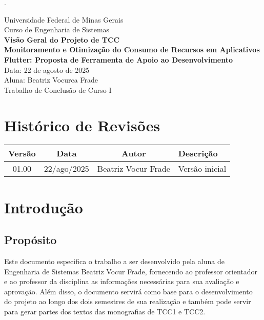 \documentclass[12pt,a4paper]{article}
\begin{document}
.
\begin{center}
\Large
Universidade Federal de Minas Gerais \\
Curso de Engenharia de Sistemas \\[3cm]


\textbf{\LARGE Visão Geral do Projeto de TCC} \\[1cm]


\textbf{Monitoramento e Otimização do Consumo de Recursos em Aplicativos Flutter: Proposta de Ferramenta de Apoio ao Desenvolvimento} \\[4cm]


Data: 22 de agosto de 2025 \\[4cm]


Aluna: Beatriz Vocurca Frade \\[3cm]
Trabalho de Conclusão de Curso I
\end{center}

\newpage

\section*{Histórico de Revisões}

\begin{longtable}{|c|c|c|p{7cm}|}
\hline
\textbf{Versão} & \textbf{Data} & \textbf{Autor} & \textbf{Descrição} \\ \hline
01.00 & 22/ago/2025 & Beatriz Vocur Frade & Versão inicial \\ \hline
\end{longtable}

\newpage

\tableofcontents
\newpage

\section{Introdução}

\subsection{Propósito}
Este documento especifica o trabalho a ser desenvolvido pela aluna de Engenharia de Sistemas Beatriz Vocur Frade, fornecendo ao professor orientador e ao professor da disciplina as informações necessárias para sua avaliação e aprovação. Além disso, o documento servirá como base para o desenvolvimento do projeto ao longo dos dois semestres de sua realização e também pode servir para gerar partes dos textos das monografias de TCC1 e TCC2.
\end{document}
